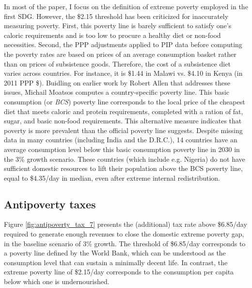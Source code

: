 In most of the paper, I focus on the definition of extreme poverty employed in the first SDG. However, the \$2.15 threshold has been criticized for inaccurately measuring poverty. %
First, this poverty line %
is barely sufficient to satisfy one's caloric requirements and is too low to procure a healthy diet or non-food necessities. 
Second, the PPP adjustments applied to PIP data before computing the poverty rates are based on prices of an average consumption basket rather than on prices of subsistence goods.\cite{sullivan_capitalist_2023} Therefore, the cost of a subsistence diet varies across countries. For instance, it is \$1.44 in Malawi vs. \$4.10 in Kenya (in 2011 PPP \$).\cite{moatsos_global_2016} Buidling on earlier work by Robert Allen that addresses these issues,\cite{allen_absolute_2017} Michail Moatsos computes a country-specific poverty line. This basic consumption (or \textit{BCS}) poverty line corresponds to the local price of the cheapest diet that meets caloric and protein requirements, completed with a ration of fat, sugar, and basic non-food requirements.\cite{moatsos_global_2016,moatsos_global_2021,sullivan_capitalist_2023} This alternative measure indicates that poverty %
is more prevalent than the official poverty line suggests. Despite missing data in many countries (including India and the D.R.C.), 14 countries have an average consumption level below this basic consumption poverty line in 2030 in the 3\% growth scenario. These countries (which include e.g. Nigeria) do not have sufficient domestic resources to lift their population above the BCS poverty line, equal to \$4.35/day in median, even after extreme internal redistribution. 

\subsection{Antipoverty taxes}

Figure \ref{fig:antipoverty_tax_7} presents the (additional) tax rate above \$6.85/day required to generate enough revenues to close the domestic extreme poverty gap, in the baseline scenario of 
3\% growth. The threshold of \$6.85/day corresponds to a poverty line defined by the World Bank, which can be understood as the consumption level that can sustain a minimally decent life.\cite{hickel_is_2019,kikstra_decent_2021} In contrast, the extreme poverty line of \$2.15/day corresponds to the consumption per capita below which one is undernourished.\cite{allen_absolute_2017} 

